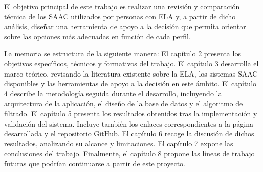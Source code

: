 El objetivo principal de este trabajo es realizar una revisión y comparación técnica de los SAAC utilizados por personas con ELA y, a partir de dicho análisis, diseñar una herramienta de apoyo a la decisión que permita orientar sobre las opciones más adecuadas en función de cada perfil. 

La memoria se estructura de la siguiente manera:
El capítulo 2 presenta los objetivos específicos, técnicos y formativos del trabajo. 
El capítulo 3 desarrolla el marco teórico, revisando la literatura existente sobre la ELA, los sistemas SAAC disponibles y las herramientas de apoyo a la decisión en este ámbito. 
El capítulo 4 describe la metodología seguida durante el desarrollo, incluyendo la arquitectura de la aplicación, el diseño de la base de datos y el algoritmo de filtrado.
El capítulo 5 presenta los resultados obtenidos tras la implementación y validación del sistema. Incluye también los enlaces correspondientes a la página desarrollada y el repositorio GitHub. 
El capítulo 6 recoge la discusión de dichos resultados, analizando su alcance y limitaciones. 
El capítulo 7 expone las conclusiones del trabajo. 
Finalmente, el capítulo 8 propone las líneas de trabajo futuras que podrían continuarse a partir de este proyecto.
